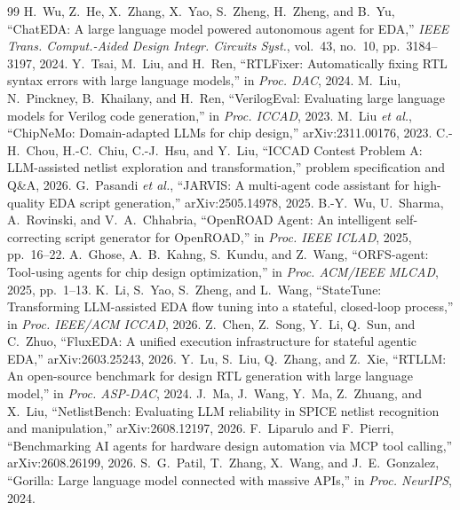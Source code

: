 \documentclass[conference,letterpaper]{IEEEtran}
\begin{document}
\clearpage
\begin{thebibliography}{99}
 H.~Wu, Z.~He, X.~Zhang, X.~Yao, S.~Zheng, H.~Zheng, and B.~Yu, ``ChatEDA: A large language model powered autonomous agent for EDA,'' \emph{IEEE Trans. Comput.-Aided Design Integr. Circuits Syst.}, vol.~43, no.~10, pp.~3184--3197, 2024.
 Y.~Tsai, M.~Liu, and H.~Ren, ``RTLFixer: Automatically fixing RTL syntax errors with large language models,'' in \emph{Proc. DAC}, 2024.
 M.~Liu, N.~Pinckney, B.~Khailany, and H.~Ren, ``VerilogEval: Evaluating large language models for Verilog code generation,'' in \emph{Proc. ICCAD}, 2023.
 M.~Liu \emph{et al.}, ``ChipNeMo: Domain-adapted LLMs for chip design,'' arXiv:2311.00176, 2023.
 C.-H.~Chou, H.-C.~Chiu, C.-J.~Hsu, and Y.~Liu, ``ICCAD Contest Problem A: LLM-assisted netlist exploration and transformation,'' problem specification and Q\&A, 2026.
 G.~Pasandi \emph{et al.}, ``JARVIS: A multi-agent code assistant for high-quality EDA script generation,'' arXiv:2505.14978, 2025.
 B.-Y.~Wu, U.~Sharma, A.~Rovinski, and V.~A.~Chhabria, ``OpenROAD Agent: An intelligent self-correcting script generator for OpenROAD,'' in \emph{Proc. IEEE ICLAD}, 2025, pp.~16--22.
 A.~Ghose, A.~B.~Kahng, S.~Kundu, and Z.~Wang, ``ORFS-agent: Tool-using agents for chip design optimization,'' in \emph{Proc. ACM/IEEE MLCAD}, 2025, pp.~1--13.
 K.~Li, S.~Yao, S.~Zheng, and L.~Wang, ``StateTune: Transforming LLM-assisted EDA flow tuning into a stateful, closed-loop process,'' in \emph{Proc. IEEE/ACM ICCAD}, 2026.
 Z.~Chen, Z.~Song, Y.~Li, Q.~Sun, and C.~Zhuo, ``FluxEDA: A unified execution infrastructure for stateful agentic EDA,'' arXiv:2603.25243, 2026.
 Y.~Lu, S.~Liu, Q.~Zhang, and Z.~Xie, ``RTLLM: An open-source benchmark for design RTL generation with large language model,'' in \emph{Proc. ASP-DAC}, 2024.
 J.~Ma, J.~Wang, Y.~Ma, Z.~Zhuang, and X.~Liu, ``NetlistBench: Evaluating LLM reliability in SPICE netlist recognition and manipulation,'' arXiv:2608.12197, 2026.
 F.~Liparulo and F.~Pierri, ``Benchmarking AI agents for hardware design automation via MCP tool calling,'' arXiv:2608.26199, 2026.
 S.~G.~Patil, T.~Zhang, X.~Wang, and J.~E.~Gonzalez, ``Gorilla: Large language model connected with massive APIs,'' in \emph{Proc. NeurIPS}, 2024.

\end{thebibliography}
\end{document}

